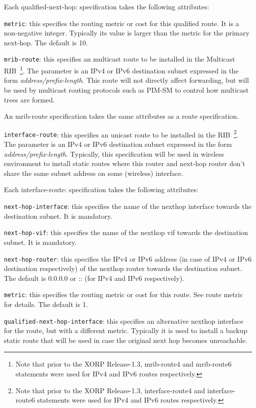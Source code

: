 \begin{description}
\begin{description}
  Each {\stt qualified-next-hop}: specification takes the following
  attributes:

\begin{description}
\item{\tt metric}: this specifies the routing metric or cost for this
  qualified route.  It is a non-negative integer.  Typically its value
  is larger than the metric for the primary next-hop.
  The default is 10.
\end{description}

\end{description}

\item{\tt mrib-route}: this specifies an multicast route to be installed
  in the Multicast RIB~\footnote{Note that prior to the XORP
  Release-1.3, mrib-route4 and mrib-route6 statements were used for IPv4
  and IPv6 routes respectively.}.  The parameter is an IPv4 or IPv6
  destination subnet expressed in the form {\it address/prefix-length}.
  This route will not directly affect forwarding, but will be used by
  multicast routing protocols such as PIM-SM to control how multicast
  trees are formed.

  An {\stt mrib-route} specification takes the same attributes as a
  {\stt route} specification.

\item{\tt interface-route}: this specifies an unicast route to be
  installed in the RIB~\footnote{Note that prior to the XORP
  Release-1.3, interface-route4 and interface-route6 statements were
  used for IPv4 and IPv6 routes respectively.}.  The parameter is an
  IPv4 or IPv6 destination subnet expressed in the form {\it
  address/prefix-length}. Typically, this specification will be used in
  wireless environment to install static routes where this router and
  next-hop router don't share the same subnet address on some (wireless)
  interface.

  Each {\stt interface-route}: specification takes the following attributes:

\begin{description}
\item{\tt next-hop-interface}: this specifies the name of the nexthop
  interface towards the destination subnet. It is mandatory.
\item{\tt next-hop-vif}: this specifies the name of the nexthop
  vif towards the destination subnet. It is mandatory.
\item{\tt next-hop-router}: this specifies the IPv4 or IPv6 address (in
  case of IPv4 or IPv6 destination respectively) of the nexthop router
  towards the destination subnet. The default is 0.0.0.0 or :: (for
  IPv4 and IPv6 respectively).
\item{\tt metric}: this specifies the routing metric or cost for this
  route.  See {\stt route metric} for details. The default is 1.
\item{\tt qualified-next-hop-interface}: this specifies an alternative
  nexthop interface for the route, but with a different
  metric. Typically it is used to install a backup static route that
  will be used in case the original next hop becomes unreachable.


\end{description}
\end{description}
